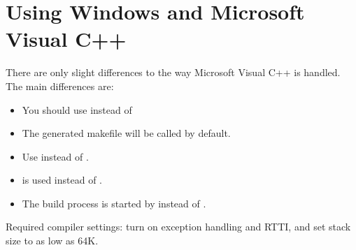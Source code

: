 \section{Using Windows and Microsoft Visual C++}

There are only slight differences to the way Microsoft Visual C++
is handled. The main differences are:
\begin{itemize}
  \item{You should use  instead of }
  \item{The generated makefile will be called  by default.}
  \item{Use  instead of .}
  \item{ is used instead of .}
  \item{The build process is started by  instead of .}
\end{itemize}

Required compiler settings: turn on exception handling and RTTI, and
set stack size to as low as 64K.



